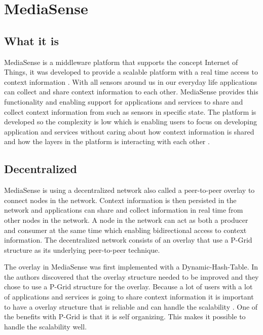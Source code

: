 \section{MediaSense}

\subsection{What it is}
MediaSense is a middleware platform that supports the concept Internet of Things, it was developed to provide a scalable platform with a real time access to context information \cite{Kanter539187}. With all sensors around us in our everyday life applications can collect and share context information to each other. MediaSense provides this functionality and enabling support for applications and services to share and collect context information from such as sensors in specific state. The platform is developed so the complexity is low which is enabling users to focus on developing application and services without caring about how context information is shared and how the layers in the platform is interacting with each other \cite{Walters413794}.

\subsection{Decentralized}
MediaSense is using a decentralized network also called a peer-to-peer overlay to connect nodes in the network. Context information is then persisted in the network and applications can share and collect information in real time from other nodes in the network. A node in the network can act as both a producer and consumer at the same time which enabling bidirectional access to context information. The decentralized network consists of an overlay that use a P-Grid \cite{aberer2003p} structure as its underlying peer-to-peer technique.

The overlay in MediaSense was first implemented with a Dynamic-Hash-Table. In \cite{Walters413794} the authors discovered that the overlay structure needed to be improved and they chose to use a P-Grid structure for the overlay. Because a lot of users with a lot of applications and services is going to share context information it is important to have a overlay structure that is reliable and can handle the scalability \cite{aberer2003p}. One of the benefits with P-Grid is that it is self organizing. This makes it possible to handle the scalability well.

